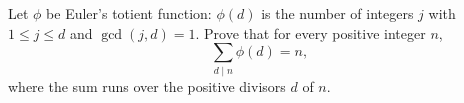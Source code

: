 Let $\phi$ be Euler's totient function: $\phi(d)$ is the number of integers $j$ with $1\le j\le d$ and $\gcd(j,d)=1$. Prove that for every positive integer $n$,
\[\sum_{d\mid n}\phi(d)=n,\]
where the sum runs over the positive divisors $d$ of $n$.
